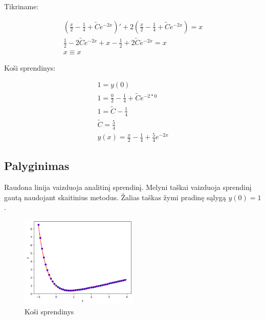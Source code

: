 \documentclass[11pt]{article}
\begin{document}
Tikriname:

\begin{equation}
\begin{split}
\left(\frac{x}{2}-\frac{1}{4}+\widetilde{C}e^{-2x}\right)'+2\left(\frac{x}{2}-\frac{1}{4}+\widetilde{C}e^{-2x}\right)=x\\
\frac{1}{2}-2\widetilde{C}e^{-2x}+x-\frac{1}{2}+2\widetilde{C}e^{-2x}=x\\
x\equiv x
\end{split}
\end{equation}

Koši sprendinys:

\begin{equation}
\begin{split}
1=y(0)\\
1=\frac{0}{2}-\frac{1}{4}+\widetilde{C}e^{-2*0}\\
1=\widetilde{C}-\frac{1}{4}\\
\widetilde{C}=\frac{5}{4}\\
y(x)=\frac{x}{2}-\frac{1}{4}+\frac{5}{4}e^{-2x}
\end{split}
\end{equation}

\newpage
\subsection{Palyginimas}

Raudona linija vaizduoja analitinį sprendinį. Melyni taškai vaizduoja sprendinį gautą naudojant skaitinius metodus. Žalias taškas žymi pradinę sąlygą $y(0)=1$.

\begin{figure}[h!]
    \centering
    \includegraphics[width=0.5\textwidth]{3.png}
    \caption{Koši sprendinys}
    \label{fig:pvz3}
\end{figure}
\end{document}
